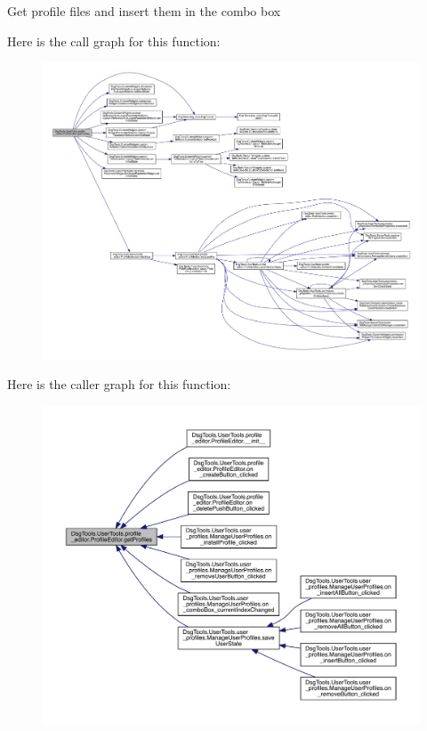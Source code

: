 \begin{DoxyVerb}Get profile files and insert them in the combo box
\end{DoxyVerb}
 Here is the call graph for this function\+:
\nopagebreak
\begin{figure}[H]
\begin{center}
\leavevmode
\includegraphics[width=350pt]{class_dsg_tools_1_1_user_tools_1_1profile__editor_1_1_profile_editor_ae315bbaa474d1424260898dc694e43a7_cgraph}
\end{center}
\end{figure}
Here is the caller graph for this function\+:
\nopagebreak
\begin{figure}[H]
\begin{center}
\leavevmode
\includegraphics[width=350pt]{class_dsg_tools_1_1_user_tools_1_1profile__editor_1_1_profile_editor_ae315bbaa474d1424260898dc694e43a7_icgraph}
\end{center}
\end{figure}
